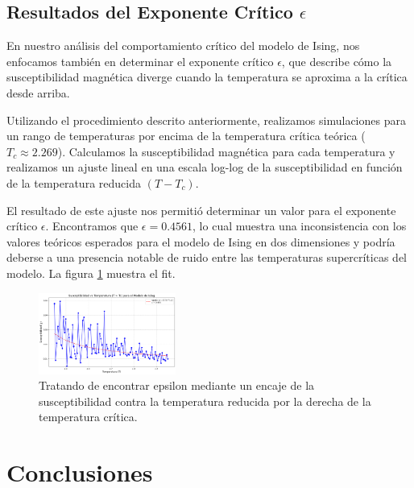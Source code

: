 \documentclass[twocolumn]{article}
\begin{document}
\subsection*{Resultados del Exponente Crítico $\epsilon$}

En nuestro análisis del comportamiento crítico del modelo de Ising, nos enfocamos también en determinar el exponente crítico $\epsilon$, que describe cómo la susceptibilidad magnética diverge cuando la temperatura se aproxima a la crítica desde arriba.

Utilizando el procedimiento descrito anteriormente, realizamos simulaciones para un rango de temperaturas por encima de la temperatura crítica teórica ($T_c \approx 2.269$). Calculamos la susceptibilidad magnética para cada temperatura y realizamos un ajuste lineal en una escala log-log de la susceptibilidad en función de la temperatura reducida $(T - T_c)$.

El resultado de este ajuste nos permitió determinar un valor para el exponente crítico $\epsilon$. Encontramos que $\epsilon = 0.4561$, lo cual muestra una inconsistencia  con los valores teóricos esperados para el modelo de Ising en dos dimensiones y podría deberse a una presencia notable de ruido entre las temperaturas supercríticas del modelo. La figura \ref{fig:epsilon}  muestra el fit.

\begin{figure}[hbt]
    \centering
    \includegraphics[width=0.4\textwidth]{figures/epsilon.png}
    \caption{Tratando de encontrar epsilon mediante un encaje de la susceptibilidad contra la temperatura reducida por la derecha de la temperatura crítica.}
    \label{fig:epsilon}
\end{figure}

\section{Conclusiones}



\end{document}
